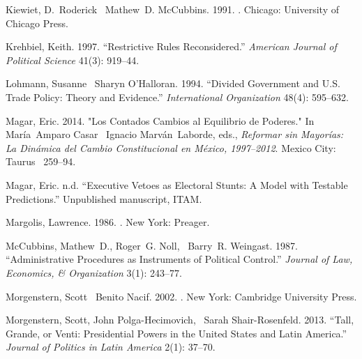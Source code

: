 \documentclass[letter,12pt]{article}
\begin{document}
\begin{thebibliography}{xx}
Kiewiet, D.~Roderick \harvardand\ Mathew~D. McCubbins. 1991.
.
\newblock Chicago:  University of Chicago Press.

Krehbiel, Keith. 1997.
\newblock ``Restrictive Rules Reconsidered.'' {\em American Journal of
  Political Science} 41(3): 919--44.

Lohmann, Susanne \harvardand\ Sharyn O'Halloran. 1994.
\newblock ``Divided Government and U.S. Trade Policy: Theory and Evidence.''
  {\em International Organization} 48(4): 595--632.

Magar, Eric. 2014.
\newblock "Los Contados Cambios al Equilibrio de Poderes."  In Mar\'ia~Amparo Casar \harvardand\ Ignacio Marv\'an~Laborde, eds., {\em Reformar sin
  Mayor\'ias: La Din\'amica del Cambio Constitucional en {M}\'exico,
  1997--2012}.
\newblock Mexico City: Taurus ~259--94.

Magar, Eric. n.d.
\newblock ``Executive Vetoes as Electoral Stunts: A Model with Testable
  Predictions.'' Unpublished manuscript, ITAM.

Margolis, Lawrence. 1986.
.
\newblock New York:  Preager.

McCubbins, Mathew~D., Roger~G. Noll, \harvardand\ Barry~R. Weingast. 1987.
\newblock ``Administrative Procedures as Instruments of Political Control.''
  {\em Journal of Law, Economics, \& Organization} 3(1): 243--77.

Morgenstern, Scott \harvardand\ Benito Nacif. 2002.
.
\newblock New York:  Cambridge University Press.

Morgenstern, Scott, John Polga-Hecimovich, \harvardand\ Sarah Shair-Rosenfeld. 2013.
\newblock ``Tall, Grande, or Venti: Presidential Powers in the United States
  and Latin America.'' {\em Journal of Politics in Latin America} 2(1): 37--70.


\end{thebibliography}
\end{document}
